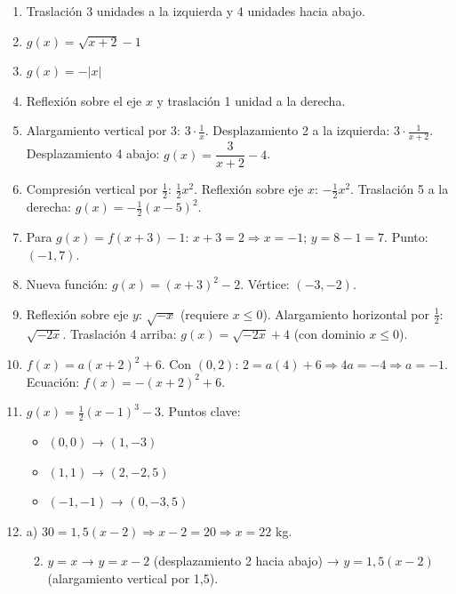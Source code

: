 \documentclass[12pt, letterpaper]{article}
\begin{document}
\begin{enumerate}[series=respuestas, leftmargin=*, label=\textbf{\arabic*.}]
  \item Traslación 3 unidades a la izquierda y 4 unidades hacia abajo.

  \item $g(x) = \sqrt{x + 2} - 1$

  \item $g(x) = -|x|$

  \item Reflexión sobre el eje $x$ y traslación 1 unidad a la derecha.

  \item Alargamiento vertical por 3: $3 \cdot \frac{1}{x}$. Desplazamiento 2 a la izquierda: $3 \cdot \frac{1}{x + 2}$. Desplazamiento 4 abajo: $g(x) = \dfrac{3}{x + 2} - 4$.

  \item Compresión vertical por $\frac{1}{2}$: $\frac{1}{2}x^2$. Reflexión sobre eje $x$: $-\frac{1}{2}x^2$. Traslación 5 a la derecha: $g(x) = -\frac{1}{2}(x - 5)^2$.

  \item Para $g(x) = f(x + 3) - 1$: $x + 3 = 2 \Rightarrow x = -1$; $y = 8 - 1 = 7$. Punto: $(-1, 7)$.

  \item Nueva función: $g(x) = (x + 3)^2 - 2$. Vértice: $(-3, -2)$.

  \item Reflexión sobre eje $y$: $\sqrt{-x}$ (requiere $x \leq 0$). Alargamiento horizontal por $\frac{1}{2}$: $\sqrt{-2x}$. Traslación 4 arriba: $g(x) = \sqrt{-2x} + 4$ (con dominio $x \leq 0$).

  \item $f(x) = a(x + 2)^2 + 6$. Con $(0, 2)$: $2 = a(4) + 6 \Rightarrow 4a = -4 \Rightarrow a = -1$. Ecuación: $f(x) = -(x + 2)^2 + 6$.

  \item $g(x) = \frac{1}{2}(x - 1)^3 - 3$. Puntos clave:
        \begin{itemize}
          \item $(0, 0)$ → $(1, -3)$
          \item $(1, 1)$ → $(2, -2{,}5)$
          \item $(-1, -1)$ → $(0, -3{,}5)$
        \end{itemize}

  \item a) $30 = 1{,}5(x - 2) \Rightarrow x - 2 = 20 \Rightarrow x = 22$ kg.
        \begin{enumerate}[label=\alph*)]
          \setcounter{enumi}{1}
          \item $y = x$ → $y = x - 2$ (desplazamiento 2 hacia abajo) → $y = 1{,}5(x - 2)$ (alargamiento vertical por 1,5).
        \end{enumerate}
\end{enumerate}
\end{document}
